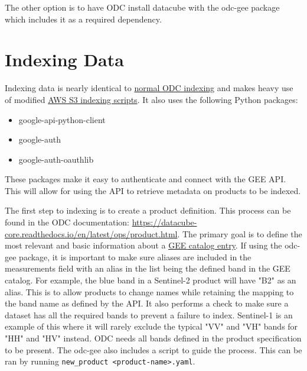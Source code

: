 \documentclass{article}
\begin{document}
The other option is to have ODC install datacube with the odc-gee package which
includes it as a required dependency.

\chapter{Indexing Data}
Indexing data is nearly identical to
\href{https://datacube-core.readthedocs.io/en/latest/ops/indexing.html}{normal
ODC indexing} and makes heavy use of modified
\href{https://github.com/opendatacube/datacube-dataset-config/blob/master/scripts/index_from_s3_bucket.py}{AWS
S3 indexing scripts}. It also uses the following Python packages:
\begin{itemize}
	\item google-api-python-client
	\item google-auth
	\item google-auth-oauthlib
\end{itemize}
These packages make it easy to authenticate and connect with the GEE API. This
will allow for using the API to retrieve metadata on products to be indexed.

The first step to indexing is to create a product definition. This
process can be found in the ODC documentation:
\url{https://datacube-core.readthedocs.io/en/latest/ops/product.html}. The
primary goal is to define the most relevant and basic information about a
\href{https://developers.google.com/earth-engine/datasets}{GEE catalog entry}.
If using the odc-gee package, it is important to make sure aliases are included
in the measurements field with an alias in the list being the defined
band in the GEE catalog. For example, the blue band in a Sentinel-2 product
will have "B2" as an alias. This is to allow products to change names
while retaining the mapping to the band name as defined by the API. It also
performs a check to make sure a dataset has all the required bands to prevent a
failure to index. Sentinel-1 is an example of this where it will rarely exclude
the typical "VV" and "VH" bands for "HH" and "HV" instead. ODC needs all bands
defined in the product specification to be present. The odc-gee also includes a
script to guide the process. This can be ran by running
\lstinline{new_product <product-name>.yaml}.
\end{document}

